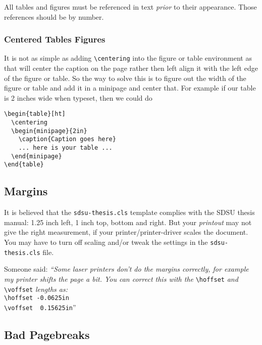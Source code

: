 All tables and figures must be referenced in text \emph{prior} to
their appearance. Those references should be by number.



\subsubsection{Centered Tables Figures}
\label{sec::centered:tab:fig}

It is not as simple as adding \verb+\centering+ into the figure or
table environment as that will center the caption on the page rather
then left align it with the left edge of the figure or table.  So the
way to solve this is to figure out the width of the figure or table
and add it in a minipage and center that.  For example if our table is
2 inches wide when typeset, then we could do
\begin{verbatim}
\begin{table}[ht]
  \centering
  \begin{minipage}{2in}
    \caption{Caption goes here}
    ... here is your table ...
  \end{minipage}
\end{table}
\end{verbatim}



\subsection{Margins}

It is believed that the \verb+sdsu-thesis.cls+ template complies with
the SDSU thesis manual: 1.25 inch left, 1 inch top, bottom and right.
But your \emph{printout} may not give the right measurement, if your
printer/printer-driver scales the document.  You may have to turn off
scaling and/or tweak the settings in the \verb+sdsu-thesis.cls+ file.

Someone said: \emph{``Some laser printers don't do the margins correctly, for
example my printer shifts the page a bit.  You can correct this with
the} \verb+\hoffset+ \emph{and} \verb+\voffset+ \emph{lengths as:}\\
\hspace*{2em}\verb+\hoffset -0.0625in+\\
\hspace*{2em}\verb+\voffset  0.15625in+''


\subsection{Bad Pagebreaks}

